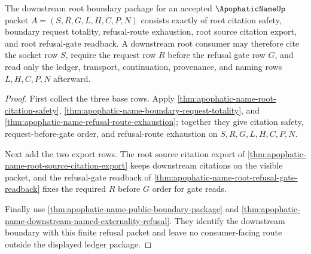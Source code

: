 \begin{theorem}
\label{thm:apophatic-name-root-boundary-ledger-package}
The downstream root boundary package for an accepted $\ApophaticNameUp$ packet $A=(S,R,G,L,H,C,P,N)$ consists exactly of root citation safety, boundary request totality, refusal-route exhaustion, root source citation export, and root refusal-gate readback. A downstream root consumer may therefore cite the socket row $S$, require the request row $R$ before the refusal gate row $G$, and read only the ledger, transport, continuation, provenance, and naming rows $L,H,C,P,N$ afterward.
\end{theorem}
\begin{proof}
First collect the three base rows. Apply \autoref{thm:apophatic-name-root-citation-safety}, \autoref{thm:apophatic-name-boundary-request-totality}, and \autoref{thm:apophatic-name-refusal-route-exhaustion}; together they give citation safety, request-before-gate order, and refusal-route exhaustion on $S,R,G,L,H,C,P,N$.

Next add the two export rows. The root source citation export of \autoref{thm:apophatic-name-root-source-citation-export} keeps downstream citations on the visible packet, and the refusal-gate readback of \autoref{thm:apophatic-name-root-refusal-gate-readback} fixes the required $R$ before $G$ order for gate reads.

Finally use \autoref{thm:apophatic-name-public-boundary-package} and \autoref{thm:apophatic-name-downstream-named-externality-refusal}. They identify the downstream boundary with this finite refusal packet and leave no consumer-facing route outside the displayed ledger package.
\end{proof}

